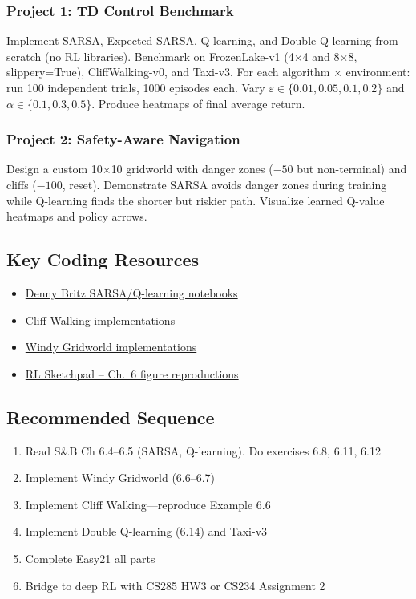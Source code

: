 \documentclass[11pt,letterpaper]{article}
\begin{document}
\subsubsection{Project 1: TD Control Benchmark}

Implement SARSA, Expected SARSA, Q-learning, and Double Q-learning from scratch (no RL libraries). Benchmark on FrozenLake-v1 (4$\times$4 and 8$\times$8, slippery=True), CliffWalking-v0, and Taxi-v3. For each algorithm $\times$ environment: run 100 independent trials, 1000 episodes each. Vary $\varepsilon \in \{0.01, 0.05, 0.1, 0.2\}$ and $\alpha \in \{0.1, 0.3, 0.5\}$. Produce heatmaps of final average return.

\subsubsection{Project 2: Safety-Aware Navigation}

Design a custom 10$\times$10 gridworld with danger zones ($-50$ but non-terminal) and cliffs ($-100$, reset). Demonstrate SARSA avoids danger zones during training while Q-learning finds the shorter but riskier path. Visualize learned Q-value heatmaps and policy arrows.

\subsection{Key Coding Resources}

\begin{itemize}[nosep]
    \item \href{https://github.com/dennybritz/reinforcement-learning}{Denny Britz SARSA/Q-learning notebooks}
    \item \href{https://github.com/SwamiKannan/CliffWalk}{Cliff Walking implementations}
    \item \href{https://github.com/georgeyiasemis/SARSA-and-Q-learning-on-a-Windy-Grid-World}{Windy Gridworld implementations}
    \item \href{https://marcinbogdanski.github.io/rl-sketchpad/RL_An_Introduction_2018/0604_Sarsa.html}{RL Sketchpad -- Ch.\ 6 figure reproductions}
\end{itemize}

\subsection{Recommended Sequence}

\begin{enumerate}[nosep]
    \item Read S\&B Ch 6.4--6.5 (SARSA, Q-learning). Do exercises 6.8, 6.11, 6.12
    \item Implement Windy Gridworld (6.6--6.7)
    \item Implement Cliff Walking---reproduce Example 6.6
    \item Implement Double Q-learning (6.14) and Taxi-v3
    \item Complete Easy21 all parts
    \item Bridge to deep RL with CS285 HW3 or CS234 Assignment 2
\end{enumerate}
\end{document}
